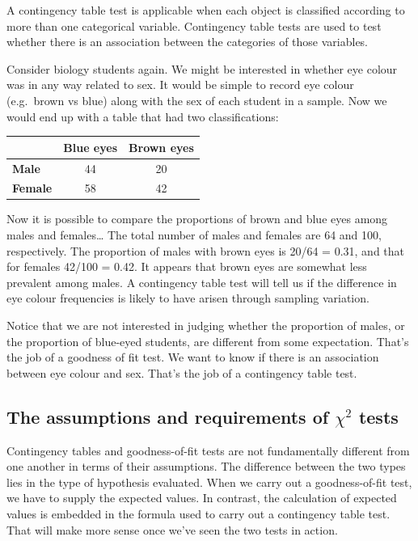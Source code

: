 \documentclass[
]{book}
\begin{document}
A contingency table test is applicable when each object is classified according to more than one categorical variable. Contingency table tests are used to test whether there is an association between the categories of those variables.

Consider biology students again. We might be interested in whether eye colour was in any way related to sex. It would be simple to record eye colour (e.g.~brown vs blue) along with the sex of each student in a sample. Now we would end up with a table that had two classifications:

\begin{longtable}[]{@{}lcc@{}}
\toprule()
& Blue eyes & Brown eyes \\
\midrule()
\endhead
\textbf{Male} & 44 & 20 \\
\textbf{Female} & 58 & 42 \\
\bottomrule()
\end{longtable}

Now it is possible to compare the proportions of brown and blue eyes among males and females\ldots{} The total number of males and females are 64 and 100, respectively. The proportion of males with brown eyes is 20/64 = 0.31, and that for females 42/100 = 0.42. It appears that brown eyes are somewhat less prevalent among males. A contingency table test will tell us if the difference in eye colour frequencies is likely to have arisen through sampling variation.

Notice that we are not interested in judging whether the proportion of males, or the proportion of blue-eyed students, are different from some expectation. That's the job of a goodness of fit test. We want to know if there is an association between eye colour and sex. That's the job of a contingency table test.

\hypertarget{the-assumptions-and-requirements-of-chi2-tests}{%
\subsection{\texorpdfstring{The assumptions and requirements of \(\chi^{2}\) tests}{The assumptions and requirements of \textbackslash chi\^{}\{2\} tests}}\label{the-assumptions-and-requirements-of-chi2-tests}}

Contingency tables and goodness-of-fit tests are not fundamentally different from one another in terms of their assumptions. The difference between the two types lies in the type of hypothesis evaluated. When we carry out a goodness-of-fit test, we have to supply the expected values. In contrast, the calculation of expected values is embedded in the formula used to carry out a contingency table test. That will make more sense once we've seen the two tests in action.
\end{document}
